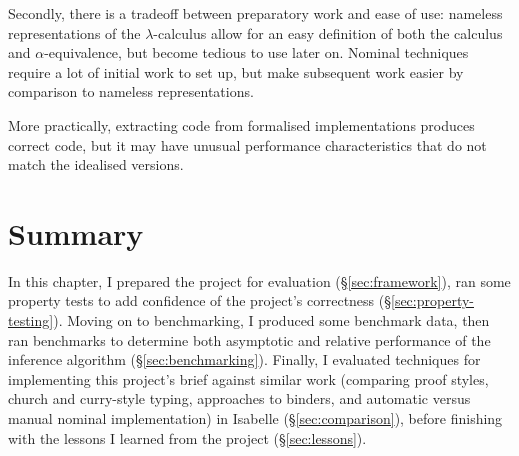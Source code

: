 Secondly, there is a tradeoff between preparatory work and ease of use: nameless representations of the \(\lambda\)-calculus allow for an easy definition of both the calculus and \(\alpha\)-equivalence, but become tedious to use later on.
Nominal techniques require a lot of initial work to set up, but make subsequent work easier by comparison to nameless representations.

More practically, extracting code from formalised implementations produces correct code, but it may have unusual performance characteristics that do not match the idealised versions.

\section{Summary}
In this chapter, I prepared the project for evaluation (\S\ref{sec:framework}), ran some property tests to add confidence of the project's correctness (\S\ref{sec:property-testing}).
Moving on to benchmarking, I produced some benchmark data, then ran benchmarks to determine both asymptotic and relative performance of the inference algorithm (\S\ref{sec:benchmarking}).
Finally, I evaluated techniques for implementing this project's brief against similar work (comparing proof styles, church and curry-style typing, approaches to binders, and automatic versus manual nominal implementation) in Isabelle (\S\ref{sec:comparison}), before finishing with the lessons I learned from the project (\S\ref{sec:lessons}).
